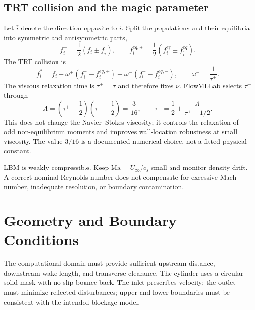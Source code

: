 \documentclass[11pt]{article}
\newcommand{\Ma}{\mathrm{Ma}}
\begin{document}
\subsection{TRT collision and the magic parameter}
Let $\bar i$ denote the direction opposite to $i$. Split the populations and
their equilibria into symmetric and antisymmetric parts,
\begin{equation}
 f_i^{\pm}=\frac12(f_i\pm f_{\bar i}),\qquad
 f_i^{eq,\pm}=\frac12(f_i^{eq}\pm f_{\bar i}^{eq}).
\end{equation}
The TRT collision is
\begin{equation}
 f_i^*=f_i-\omega^+\!\left(f_i^+-f_i^{eq,+}\right)
              -\omega^-\!\left(f_i^--f_i^{eq,-}\right),
\qquad \omega^\pm=\frac{1}{\tau^\pm}.
\end{equation}
The viscous relaxation time is $\tau^+=\tau$ and therefore fixes $\nu$.
FlowMLLab selects $\tau^-$ through
\begin{equation}
\Lambda=\left(\tau^+-\frac12\right)\left(\tau^--\frac12\right)
=\frac{3}{16},
\qquad
\tau^-=\frac12+\frac{\Lambda}{\tau^+-1/2}.
\end{equation}
This does not change the Navier--Stokes viscosity; it controls the relaxation
of odd non-equilibrium moments and improves wall-location robustness at small
viscosity. The value $3/16$ is a documented numerical choice, not a fitted
physical constant.

\begin{warningbox}
LBM is weakly compressible. Keep $\Ma=U_\infty/c_s$ small and monitor density drift. A correct nominal Reynolds number does not compensate for excessive Mach number, inadequate resolution, or boundary contamination.
\end{warningbox}

\newpage
\section{Geometry and Boundary Conditions}
The computational domain must provide sufficient upstream distance, downstream wake length, and transverse clearance. The cylinder uses a circular solid mask with no-slip bounce-back. The inlet prescribes velocity; the outlet must minimize reflected disturbances; upper and lower boundaries must be consistent with the intended blockage model.

\begin{center}
\end{center}
\end{document}
